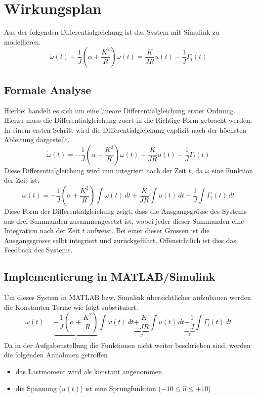 \section{Wirkungsplan}
Aus der folgenden Differentialgleichung ist das System mit Simulink zu
modellieren.
\[
	\dot{\omega}(t)
		+ \frac{1}{J} \left(\alpha + \frac{K^2}{R}\right) \omega(t)
	= \frac{K}{JR} u(t) - \frac{1}{J} \Gamma_l(t)
\]

\subsection{Formale Analyse}
Hierbei handelt es sich um eine lineare Differentialgleichung erster Ordnung.
Hierzu muss die Differentialgleichung zuert in die Richtige Form gebracht
werden. In einem ersten Schritt wird die Differentialgleichung explizit nach
der höchsten Ableitung dargestellt.
\[
	\dot{\omega}(t)
	= - \frac{1}{J} \left(\alpha + \frac{K^2}{R} \right) \omega(t)
		+ \frac{K}{JR} u(t) - \frac{1}{J} \Gamma_l(t)	
\]
Diese Differentialgleichung wird nun integriert nach der Zeit $t$, da $\omega$
eine Funktion der Zeit ist.
\[
	\omega(t)
	= - \frac{1}{J} \left(\alpha + \frac{K^2}{R} \right) \int\omega(t)\,dt
		+ \frac{K}{JR} \int u(t)\,dt
		- \frac{1}{J} \int \Gamma_l(t)\,dt
\]
Diese Form der Differentialgleichung zeigt, dass die Ausgangsgrösse des
Systems aus drei Summanden zusammengesetzt ist, wobei jeder dieser Summanden
eine Integration nach der Zeit $t$ aufweist. Bei einer dieser Grössen ist
die Ausgangsgrösse selbt integriert und zurückgeführt. Offensichtlich ist dies
das Feedback des Systems.

\subsection{Implementierung in MATLAB/Simulink}
Um dieses System in MATLAB bzw. Simulink übersichtlicher aufzubauen werden
die Konstanten Terme wie folgt substituiert.
\[
	\omega(t)
	= \underbrace{- \frac{1}{J} \left(\alpha + \frac{K^2}{R} \right)}_{x}
		\int\omega(t)\,dt
		\underbrace{+ \frac{K}{JR}}_{y} \int u(t)\,dt
		\underbrace{- \frac{1}{J}}_{z} \int \Gamma_l(t)\,dt
\]
Da in der Aufgabenstellung die Funktionen nicht weiter beschrieben sind,
werden die folgenden Annahmen getroffen
\begin{itemize}
	\item das Lastmoment wird als konstant angenommen
	\item die Spannung ($u(t)$) ist eine Sprungfunktion
		($-10 \leq \hat{u} \leq +10$)
\end{itemize}

